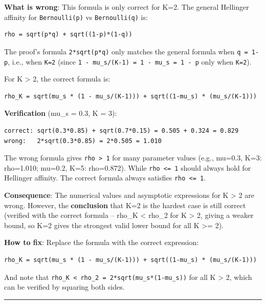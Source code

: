 \documentclass[
  12pt,
]{article}
\begin{document}
\textbf{What is wrong}: This formula is only correct for K=2. The
general Hellinger affinity for \texttt{Bernoulli(p)} vs
\texttt{Bernoulli(q)} is:

\begin{verbatim}
rho = sqrt(p*q) + sqrt((1-p)*(1-q))
\end{verbatim}

The proof's formula \texttt{2*sqrt(p*q)} only matches the general
formula when \texttt{q\ =\ 1-p}, i.e., when \texttt{K=2} (since
\texttt{1\ -\ mu\_s/(K-1)\ =\ 1\ -\ mu\_s\ =\ 1\ -\ p} only when
\texttt{K=2}).

For K \textgreater{} 2, the correct formula is:

\begin{verbatim}
rho_K = sqrt(mu_s * (1 - mu_s/(K-1))) + sqrt((1-mu_s) * (mu_s/(K-1)))
\end{verbatim}

\textbf{Verification} (mu\_s = 0.3, K = 3):

\begin{verbatim}
correct: sqrt(0.3*0.85) + sqrt(0.7*0.15) = 0.505 + 0.324 = 0.829
wrong:   2*sqrt(0.3*0.85) = 2*0.505 = 1.010
\end{verbatim}

The wrong formula gives \texttt{rho\ \textgreater{}\ 1} for many
parameter values (e.g., mu=0.3, K=3: rho=1.010; mu=0.2, K=5: rho=0.872).
While \texttt{rho\ \textless{}=\ 1} should always hold for Hellinger
affinity. The correct formula always satisfies
\texttt{rho\ \textless{}=\ 1}.

\textbf{Consequence}: The numerical values and asymptotic expressions
for K \textgreater{} 2 are wrong. However, the \textbf{conclusion} that
K=2 is the hardest case is still correct (verified with the correct
formula -- rho\_K \textless{} rho\_2 for K \textgreater{} 2, giving a
weaker bound, so K=2 gives the strongest valid lower bound for all K
\textgreater= 2).

\textbf{How to fix}: Replace the formula with the correct expression:

\begin{verbatim}
rho_K = sqrt(mu_s * (1 - mu_s/(K-1))) + sqrt((1-mu_s) * (mu_s/(K-1)))
\end{verbatim}

And note that
\texttt{rho\_K\ \textless{}\ rho\_2\ =\ 2*sqrt(mu\_s*(1-mu\_s))} for all
K \textgreater{} 2, which can be verified by squaring both sides.

\begin{center}\rule{0.5\linewidth}{0.5pt}\end{center}
\end{document}
